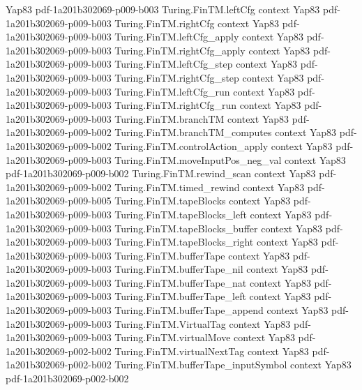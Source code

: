 \begin{theorem}
  {Yap83}
  {pdf-1a201b302069-p009-b003}
\proofstep
  {Turing.FinTM.leftCfg}
  {context}
  {Yap83}
  {pdf-1a201b302069-p009-b003}
\proofstep
  {Turing.FinTM.rightCfg}
  {context}
  {Yap83}
  {pdf-1a201b302069-p009-b003}
\proofstep
  {Turing.FinTM.leftCfg_apply}
  {context}
  {Yap83}
  {pdf-1a201b302069-p009-b003}
\proofstep
  {Turing.FinTM.rightCfg_apply}
  {context}
  {Yap83}
  {pdf-1a201b302069-p009-b003}
\proofstep
  {Turing.FinTM.leftCfg_step}
  {context}
  {Yap83}
  {pdf-1a201b302069-p009-b003}
\proofstep
  {Turing.FinTM.rightCfg_step}
  {context}
  {Yap83}
  {pdf-1a201b302069-p009-b003}
\proofstep
  {Turing.FinTM.leftCfg_run}
  {context}
  {Yap83}
  {pdf-1a201b302069-p009-b003}
\proofstep
  {Turing.FinTM.rightCfg_run}
  {context}
  {Yap83}
  {pdf-1a201b302069-p009-b003}
\proofstep
  {Turing.FinTM.branchTM}
  {context}
  {Yap83}
  {pdf-1a201b302069-p009-b002}
\proofstep
  {Turing.FinTM.branchTM_computes}
  {context}
  {Yap83}
  {pdf-1a201b302069-p009-b002}
\proofstep
  {Turing.FinTM.controlAction_apply}
  {context}
  {Yap83}
  {pdf-1a201b302069-p009-b003}
\proofstep
  {Turing.FinTM.moveInputPos_neg_val}
  {context}
  {Yap83}
  {pdf-1a201b302069-p009-b002}
\proofstep
  {Turing.FinTM.rewind_scan}
  {context}
  {Yap83}
  {pdf-1a201b302069-p009-b002}
\proofstep
  {Turing.FinTM.timed_rewind}
  {context}
  {Yap83}
  {pdf-1a201b302069-p009-b005}
\proofstep
  {Turing.FinTM.tapeBlocks}
  {context}
  {Yap83}
  {pdf-1a201b302069-p009-b003}
\proofstep
  {Turing.FinTM.tapeBlocks_left}
  {context}
  {Yap83}
  {pdf-1a201b302069-p009-b003}
\proofstep
  {Turing.FinTM.tapeBlocks_buffer}
  {context}
  {Yap83}
  {pdf-1a201b302069-p009-b003}
\proofstep
  {Turing.FinTM.tapeBlocks_right}
  {context}
  {Yap83}
  {pdf-1a201b302069-p009-b003}
\proofstep
  {Turing.FinTM.bufferTape}
  {context}
  {Yap83}
  {pdf-1a201b302069-p009-b003}
\proofstep
  {Turing.FinTM.bufferTape_nil}
  {context}
  {Yap83}
  {pdf-1a201b302069-p009-b003}
\proofstep
  {Turing.FinTM.bufferTape_nat}
  {context}
  {Yap83}
  {pdf-1a201b302069-p009-b003}
\proofstep
  {Turing.FinTM.bufferTape_left}
  {context}
  {Yap83}
  {pdf-1a201b302069-p009-b003}
\proofstep
  {Turing.FinTM.bufferTape_append}
  {context}
  {Yap83}
  {pdf-1a201b302069-p009-b003}
\proofstep
  {Turing.FinTM.VirtualTag}
  {context}
  {Yap83}
  {pdf-1a201b302069-p009-b003}
\proofstep
  {Turing.FinTM.virtualMove}
  {context}
  {Yap83}
  {pdf-1a201b302069-p002-b002}
\proofstep
  {Turing.FinTM.virtualNextTag}
  {context}
  {Yap83}
  {pdf-1a201b302069-p002-b002}
\proofstep
  {Turing.FinTM.bufferTape_inputSymbol}
  {context}
  {Yap83}
  {pdf-1a201b302069-p002-b002}

\end{theorem}
